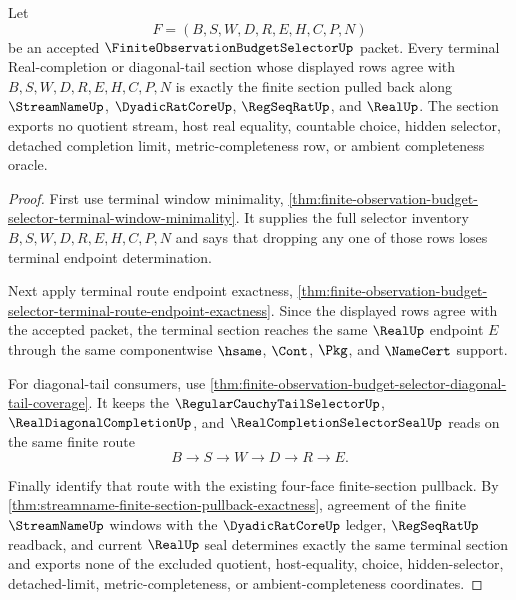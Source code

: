 \begin{theorem}
\label{thm:finite-observation-budget-selector-terminal-section-exactness}
Let
$$
F=(B,S,W,D,R,E,H,C,P,N)
$$
be an accepted $\FiniteObservationBudgetSelectorUp$ packet. Every terminal Real-completion or diagonal-tail section whose displayed rows agree with $B,S,W,D,R,E,H,C,P,N$ is exactly the finite section pulled back along $\StreamNameUp$, $\DyadicRatCoreUp$, $\RegSeqRatUp$, and $\RealUp$. The section exports no quotient stream, host real equality, countable choice, hidden selector, detached completion limit, metric-completeness row, or ambient completeness oracle.
\end{theorem}
\begin{proof}
First use terminal window minimality, \autoref{thm:finite-observation-budget-selector-terminal-window-minimality}. It supplies the full selector inventory $B,S,W,D,R,E,H,C,P,N$ and says that dropping any one of those rows loses terminal endpoint determination.

Next apply terminal route endpoint exactness, \autoref{thm:finite-observation-budget-selector-terminal-route-endpoint-exactness}. Since the displayed rows agree with the accepted packet, the terminal section reaches the same $\RealUp$ endpoint $E$ through the same componentwise $\hsame$, $\Cont$, $\Pkg$, and $\NameCert$ support.

For diagonal-tail consumers, use \autoref{thm:finite-observation-budget-selector-diagonal-tail-coverage}. It keeps the $\RegularCauchyTailSelectorUp$, $\RealDiagonalCompletionUp$, and $\RealCompletionSelectorSealUp$ reads on the same finite route
$$
B \to S \to W \to D \to R \to E.
$$

Finally identify that route with the existing four-face finite-section pullback. By \autoref{thm:streamname-finite-section-pullback-exactness}, agreement of the finite $\StreamNameUp$ windows with the $\DyadicRatCoreUp$ ledger, $\RegSeqRatUp$ readback, and current $\RealUp$ seal determines exactly the same terminal section and exports none of the excluded quotient, host-equality, choice, hidden-selector, detached-limit, metric-completeness, or ambient-completeness coordinates.
\end{proof}

